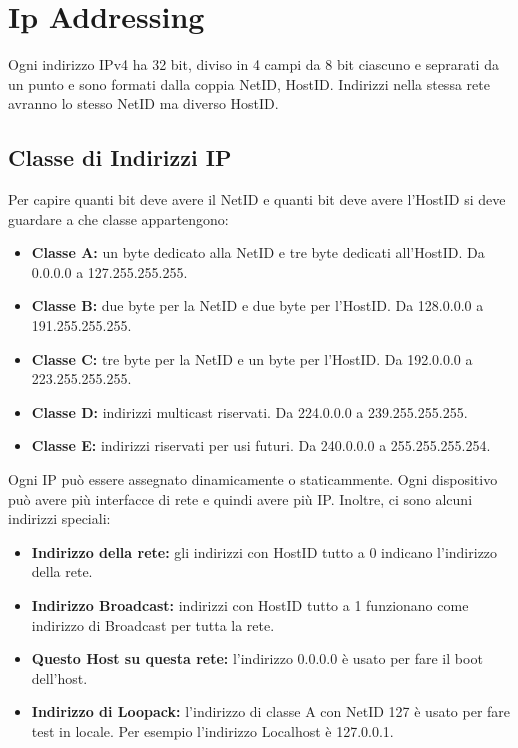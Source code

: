 \section{Ip Addressing}
Ogni indirizzo IPv4 ha 32 bit, diviso in 4 campi da 8 bit ciascuno e seprarati da un punto e sono formati dalla coppia NetID, HostID. Indirizzi nella stessa rete avranno lo stesso NetID ma diverso HostID.

\subsection{Classe di Indirizzi IP}
Per capire quanti bit deve avere il NetID e quanti bit deve avere l'HostID si deve guardare a che classe appartengono:
\begin{itemize}
    \item \textbf{Classe A:} un byte dedicato alla NetID e tre byte dedicati all'HostID. Da 0.0.0.0 a 127.255.255.255.
    \item \textbf{Classe B:} due byte per la NetID e due byte per l'HostID. Da 128.0.0.0 a 191.255.255.255.
    \item \textbf{Classe C:} tre byte per la NetID e un byte per l'HostID. Da 192.0.0.0 a 223.255.255.255.
    \item \textbf{Classe D:} indirizzi multicast riservati. Da 224.0.0.0 a 239.255.255.255. 
    \item \textbf{Classe E:} indirizzi riservati per usi futuri. Da 240.0.0.0 a 255.255.255.254.
\end{itemize}
Ogni IP può essere assegnato dinamicamente o staticammente. Ogni dispositivo può avere più interfacce di rete e quindi avere più IP.
Inoltre, ci sono alcuni indirizzi speciali:
\begin{itemize}
    \item \textbf{Indirizzo della rete:} gli indirizzi con HostID tutto a 0 indicano l'indirizzo della rete.
    \item \textbf{Indirizzo Broadcast:} indirizzi con HostID tutto a 1 funzionano come indirizzo di Broadcast per tutta la rete.
    \item \textbf{Questo Host su questa rete:} l'indirizzo 0.0.0.0 è usato per fare il boot dell'host.
    \item \textbf{Indirizzo di Loopack:} l'indirizzo di classe A con NetID 127 è usato per fare test in locale. Per esempio l'indirizzo Localhost è 127.0.0.1.
\end{itemize}

